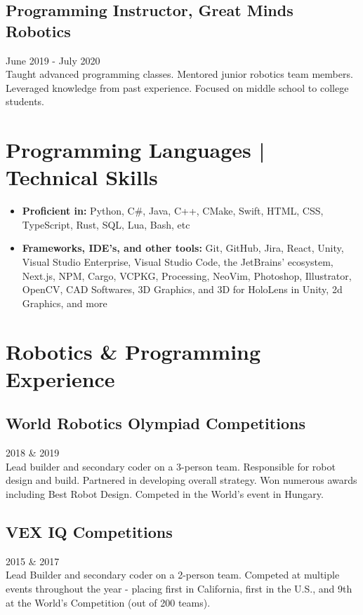 \documentclass[a4paper,10pt]{article}
\begin{document}
\subsection*{Programming Instructor, Great Minds Robotics}
June 2019 - July 2020 \\
Taught advanced programming classes. Mentored junior robotics team members. Leveraged knowledge from past experience. Focused on middle school to college students.


\section*{Programming Languages | Technical Skills}
\begin{itemize}
    \item \textbf{Proficient in:} Python, C\#, Java, C++, CMake, Swift, HTML, CSS, TypeScript, Rust, SQL, Lua, Bash, etc
    \item \textbf{Frameworks, IDE's, and other tools:} Git, GitHub, Jira, React, Unity, Visual Studio Enterprise, Visual Studio Code, the JetBrains' ecosystem, Next.js, NPM, Cargo, VCPKG, Processing, NeoVim, Photoshop, Illustrator, OpenCV, CAD Softwares, 3D Graphics, and 3D for HoloLens in Unity, 2d Graphics, and more
\end{itemize}

\section*{Robotics \& Programming Experience}
\subsection*{World Robotics Olympiad Competitions}
2018 \& 2019 \\
Lead builder and secondary coder on a 3-person team. Responsible for robot design and build. Partnered in developing overall strategy. Won numerous awards including Best Robot Design. Competed in the World’s event in Hungary.

\subsection*{VEX IQ Competitions}
2015 \& 2017 \\
Lead Builder and secondary coder on a 2-person team. Competed at multiple events throughout the year - placing first in California, first in the U.S., and 9th at the World’s Competition (out of 200 teams).
\end{document}
